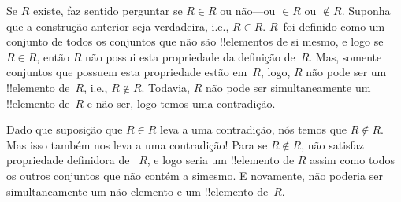 \documentclass[../../../include/open-logic-section]{subfiles}
\begin{document}

Se $R$ existe, faz sentido perguntar se $R \in R$ ou não---ou $\in R$ ou $\notin R$. Suponha que a construção anterior seja verdadeira, i.e., $R \in R$. $R$~foi definido como um conjunto de todos os conjuntos que não são !!{elemento}s de si mesmo, e logo se $R \in R$, então $R$ não possui esta propriedade da definição de~$R$. Mas, somente conjuntos que possuem esta propriedade estão em~$R$, logo, $R$ não pode ser um !!{elemento} de~$R$, i.e., $R \notin
R$. Todavia, $R$ não pode ser simultaneamente um !!{elemento} de~$R$ e não ser, logo temos uma contradição.


Dado que suposição que $R \in R$ leva a uma contradição, nós temos que $R \notin R$. Mas isso também nos leva a uma contradição! {}
Para se $R \notin R$, não satisfaz propriedade definidora de ~$R$, e logo seria um !!{elemento} de $R$ assim como todos os outros conjuntos que não contém a simesmo. E novamente, não poderia ser simultaneamente um não-elemento e um !!{elemento} de~$R$.

\end{document}
